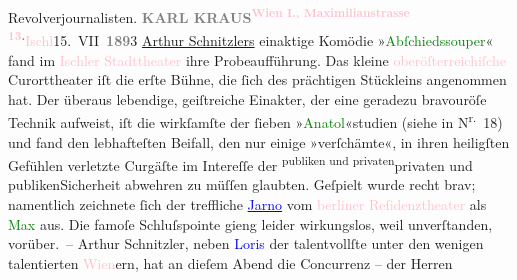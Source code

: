                   Revolverjournalisten.\pend
           \pstart
           \noindent{}{\pb}\textcolor{gray}{\textbf{KARL KRAUS}}\hfill \substVorne{}\textsuperscript{\textcolor{gray}{\textbf{\textcolor{pink}{Wien I., Maximilianstrasse 13}{}\ledrightnote{\textcolor{pink}{Mahlerstraße}}.}}}{\allowbreak}\substDazwischen{}\textcolor{pink}{Ischl}{}\ledrightnote{\textcolor{pink}{Bad Ischl}}\substHinten{}{ }15. VII \textcolor{gray}{\textbf{189}}3\pend
           \pstart
           \uline{Arthur Schnitzlers} einaktige Komödie »\textcolor{green}{Abſchiedssouper}{}\ledrightnote{\textcolor{green}{Abschiedssouper}}« fand im \textcolor{pink}{Ischler Stadttheater}{}\ledrightnote{\textcolor{pink}{Stadttheater (Bad Ischl)}} ihre Probeaufführung. Das kleine \textcolor{pink}{oberöſterreichiſche}{}\ledrightnote{\textcolor{pink}{Oberösterreich}} Curorttheater iſt die erſte
               Bühne, die ſich des prächtigen Stückleins angenommen hat.\pend
           \pstart
           Der überaus lebendige, geiſtreiche Einakter, der eine geradezu bravouröſe Technik
               aufweist, iſt die wirkſamſte der ſieben »\textcolor{green}{Anatol}{}\ledrightnote{\textcolor{green}{Anatol}}«studien (siehe \label{K_L00239_5v}\label{K_L00239_5h} in N\textsuperscript{r.} 18) und fand den lebhafteſten Beifall, den nur einige »verſchämte«, in
               ihren heiligſten Gefühlen verletzte Curgäſte im Intereſſe der \substVorne{}\textsuperscript{publiken und privaten}{\allowbreak}\substDazwischen{}privaten und publiken\substHinten{}{ }Sicherheit abwehren zu müſſen glaubten. Geſpielt
               wurde recht brav; namentlich zeichnete ſich der treffliche \textcolor{blue}{\uline{Jarno}}{}\ledrightnote{\textcolor{blue}{Josef Jarno}} vom \textcolor{pink}{berliner Reſidenztheater}{}\ledrightnote{\textcolor{pink}{Wallnertheater}} als \textcolor{green}{Max}{} aus. Die famoſe Schluſspointe
               gieng leider wirkungslos, weil unverſtanden, vorüber. –\pend
           \pstart
           Arthur Schnitzler, neben \textcolor{blue}{Loris}{}\ledrightnote{\textcolor{blue}{Richard Beer-Hofmann}} der talentvollſte
               unter den wenigen talentierten \textcolor{pink}{Wien}{}\ledrightnote{\textcolor{pink}{Wien}}ern,  hat an dieſem Abend die Concurrenz – der Herren

